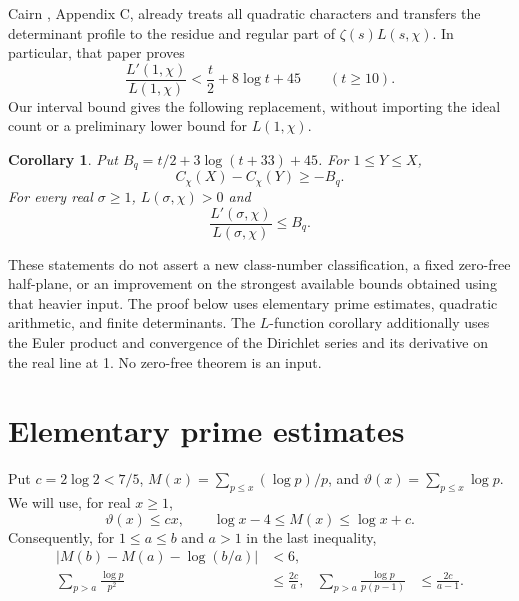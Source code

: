 \documentclass[11pt]{article}
\newtheorem{corollary}[theorem]{Corollary}
\begin{document}
Cairn \cite{cairn}, Appendix C, already treats all quadratic
characters and transfers the determinant profile to the residue and
regular part of $\zeta(s)L(s,\chi)$. In particular, that paper proves
\[
 \frac{L'(1,\chi)}{L(1,\chi)}<\frac t2+8\log t+45\qquad(t\ge10).
\]
Our interval bound gives the following replacement, without importing
the ideal count or a preliminary lower bound for $L(1,\chi)$.

\begin{corollary}\label{cor:derivative}
Put $B_q=t/2+3\log(t+33)+45$. For $1\le Y\le X$,
\begin{equation}\label{eq:drawdown}
 C_\chi(X)-C_\chi(Y)\ge-B_q.
\end{equation}
For every real $\sigma\ge1$, $L(\sigma,\chi)>0$ and
\begin{equation}\label{eq:derivative}
 \frac{L'(\sigma,\chi)}{L(\sigma,\chi)}\le B_q.
\end{equation}
\end{corollary}

These statements do not assert a new class-number classification,
a fixed zero-free half-plane, or an improvement on the strongest
available bounds obtained using that heavier input. The proof below
uses elementary prime estimates, quadratic arithmetic, and finite
determinants. The $L$-function corollary additionally uses the Euler
product and convergence of the Dirichlet series and its derivative
on the real line at 1. No zero-free theorem is an input.

\section{Elementary prime estimates}
Put $c=2\log2<7/5$, $M(x)=\sum_{p\le x}(\log p)/p$, and
$\vartheta(x)=\sum_{p\le x}\log p$.
We will use, for real $x\ge1$,
\begin{equation}\label{eq:mertens}
 \vartheta(x)\le cx,\qquad \log x-4\le M(x)\le\log x+c.
\end{equation}
Consequently, for $1\le a\le b$ and $a>1$ in the last inequality,
\begin{align}
 \left|M(b)-M(a)-\log(b/a)\right|&<6,\label{eq:interval-mertens}\\
 \sum_{p>a}\frac{\log p}{p^2}&\le\frac{2c}{a},&
 \sum_{p>a}\frac{\log p}{p(p-1)}&\le\frac{2c}{a-1}.
 \label{eq:tails}
\end{align}
\end{document}
